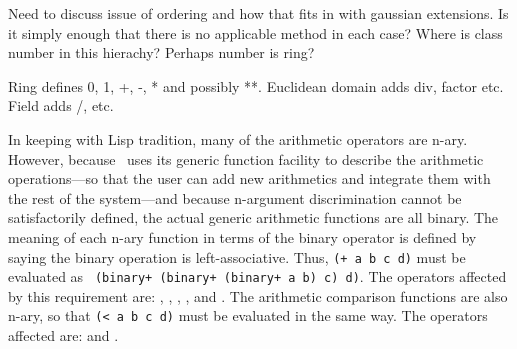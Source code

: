 \label{number}
%
\begin{optPrivate}
    Need to discuss issue of ordering and how that fits in with gaussian
    extensions.  Is it simply enough that there is no applicable method in each
    case?  Where is class number in this hierachy?  Perhaps number is ring?

    Ring defines 0, 1, +, -, * and possibly **.  Euclidean domain adds div,
    factor etc.  Field adds /, etc.
\end{optPrivate}
%
\begin{optRationale}
    In keeping with Lisp tradition, many of the arithmetic operators are n-ary.
    However, because \eulisp\ uses its generic function facility to describe the
    arithmetic operations---so that the user can add new arithmetics and
    integrate them with the rest of the system---and because n-argument
    discrimination cannot be satisfactorily defined, the actual generic
    arithmetic functions are all binary.  The meaning of each n-ary function in
    terms of the binary operator is defined by saying the binary operation is
    left-associative.  Thus, {\tt (+ a b c d)} must be evaluated as {\tt
        (binary+ (binary+ (binary+ a b) c) d)}.  The operators affected by this
    requirement are: \functionref{+}, \functionref{-}, \functionref{*},
    \functionref{/},  and .  The arithmetic
    comparison functions are also n-ary, so that {\tt (< a b c d)} must be
    evaluated in the same way.  The operators affected are: \functionref{=} and
    \functionref{<}.
\end{optRationale}
%
